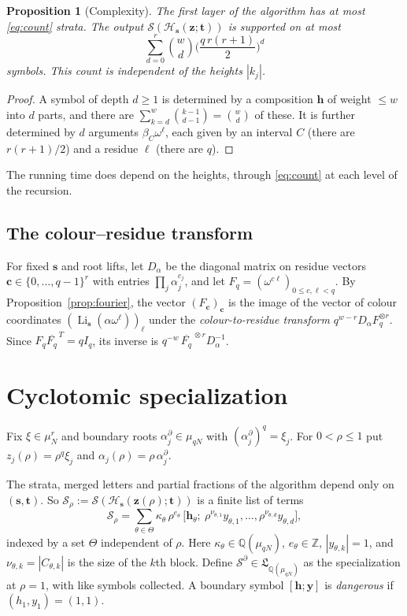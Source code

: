 \documentclass[11pt]{amsart}
\newtheorem{proposition}[theorem]{Proposition}
\theoremstyle{definition}
\theoremstyle{remark}
\numberwithin{equation}{section}
\newcommand{\Z}{\mathbb{Z}}
\newcommand{\Q}{\mathbb{Q}}
\newcommand{\Li}{\operatorname{Li}}
\newcommand{\cS}{\mathcal{S}}
\newcommand{\fL}{\mathfrak{L}}
\newcommand{\s}{\mathbf{s}}
\newcommand{\z}{\mathbf{z}}
\newcommand{\tb}{\mathbf{t}}
\newcommand{\cb}{\mathbf{c}}
\newcommand{\hb}{\mathbf{h}}
\newcommand{\yb}{\mathbf{y}}
\newcommand{\lb}{\boldsymbol{\ell}}
\newcommand{\Hs}{\mathcal{H}}
\begin{document}
\begin{proposition}[Complexity]\label{prop:complexity}
The first layer of the algorithm has at most \eqref{eq:count} strata. The output $\cS(\Hs_\s(\z;\tb))$ is supported on at most
\[
\sum_{d=0}^{r}\binom{w}{d}\Big(\frac{q\,r(r+1)}{2}\Big)^d
\]
symbols. This count is independent of the heights $|k_j|$.
\end{proposition}
\begin{proof}
A symbol of depth $d\ge1$ is determined by a composition $\hb$ of weight $\le w$ into $d$ parts, and there are $\sum_{k=d}^{w}\binom{k-1}{d-1}=\binom{w}{d}$ of these. It is further determined by $d$ arguments $\beta_C\omega^\ell$, each given by an interval $C$ (there are $r(r+1)/2$) and a residue $\ell$ (there are $q$).
\end{proof}

The running time does depend on the heights, through \eqref{eq:count} at each level of the recursion.

\subsection{The colour--residue transform}
For fixed $\s$ and root lifts, let $D_\alpha$ be the diagonal matrix on residue vectors $\cb\in\{0,\dots,q-1\}^r$ with entries $\prod_j\alpha_j^{c_j}$, and let $F_q=(\omega^{c\ell})_{0\le c,\ell<q}$. By Proposition~\ref{prop:fourier}, the vector $(F_\cb)_\cb$ is the image of the vector of colour coordinates $(\Li_\s(\alpha\omega^{\lb}))_{\lb}$ under the \emph{colour-to-residue transform} $q^{w-r}D_\alpha F_q^{\otimes r}$. Since $F_q\overline{F_q}^{\,T}=qI_q$, its inverse is $q^{-w}\,\overline{F_q}^{\,\otimes r}D_\alpha^{-1}$.

\section{Cyclotomic specialization}\label{sec:cyclo}

Fix $\xi\in\mu_N^r$ and boundary roots $\alpha_j^\partial\in\mu_{qN}$ with $(\alpha_j^\partial)^q=\xi_j$. For $0<\rho\le1$ put $z_j(\rho)=\rho^q\xi_j$ and $\alpha_j(\rho)=\rho\,\alpha_j^\partial$.

The strata, merged letters and partial fractions of the algorithm depend only on $(\s,\tb)$. So $\cS_\rho:=\cS(\Hs_\s(\z(\rho);\tb))$ is a finite list of terms
\[
\cS_\rho=\sum_{\theta\in\Theta}\kappa_\theta\,\rho^{e_\theta}\,\big[\hb_\theta;\ \rho^{\nu_{\theta,1}}y_{\theta,1},\dots,\rho^{\nu_{\theta,d}}y_{\theta,d}\big],
\]
indexed by a set $\Theta$ independent of $\rho$. Here $\kappa_\theta\in\Q(\mu_{qN})$, $e_\theta\in\Z$, $|y_{\theta,k}|=1$, and $\nu_{\theta,k}=|C_{\theta,k}|$ is the size of the $k$th block. Define $\cS^\partial\in\fL_{\Q(\mu_{qN})}$ as the specialization at $\rho=1$, with like symbols collected. A boundary symbol $[\hb;\yb]$ is \emph{dangerous} if $(h_1,y_1)=(1,1)$.
\end{document}
